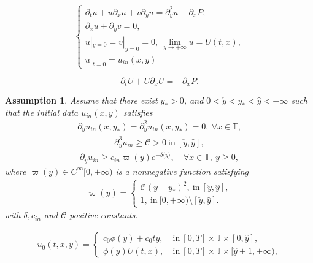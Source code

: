 \documentclass[10pt,a4paper]{amsart}
\newtheorem{assumption}{Assumption}
\newcommand\y{{{\langle y \rangle}}}
\begin{document}
\begin{equation}\label{Prandtl}
\begin{cases}
\partial_{t}u+u\partial_{x}u+v\partial_{y}u=\partial_{y}^{2}u-\partial_{x}P,\\
\partial_{x}u+\partial_{y}v=0,\\
u|_{y=0}=v|_{y=0}=0,~\lim\limits_{y\to+\infty} u=U(t,x),\\
u|_{t=0}=u_{in}(x,y)
\end{cases}
\end{equation}

\begin{equation}\label{B}
\partial_{t}U+U\partial_{x}U=-\partial_{x}P.
\end{equation}

\begin{assumption}\label{inA'}
Assume that there exist $y_\ast>0$, and $0<\check{y}<y_{*}<\hat{y}<+\infty$ such that
the initial data $u_{in}(x,y)$ satisfies
\begin{align}\label{inA1}
\partial_{y}u_{in}(x,y_{*})=\partial_{y}^{2}u_{in}(x,y_{*})=0,~\forall x\in\mathbb{T},
\end{align}
\begin{align}\label{inA2}
\partial_{y}^{3}u_{in}\geq\mathcal{C}>0~\text{in}~[\check{y},\hat{y}],
\end{align}
\begin{align}\label{inA3}
\partial_{y}u_{in}\geq c_{in}\varpi (y) e^{-\delta\y}, \quad \forall x\in  \mathbb{T}, ~y\ge 0,
\end{align}
where $\varpi(y)\in C^\infty[0,+\infty)$ is a nonnegative function satisfying
\begin{align}\label{pi}
\varpi(y)=
\begin{cases}
\mathcal{C}(y-y_{*})^{2},~\text{in}~[\check{y},\hat{y}],\\
1,~\text{in}~[0,+\infty)\setminus[\check{y},\hat{y}].
\end{cases}
\end{align}
with $\delta, c_{in}$ and $ \mathcal{C}$ positive constants.

\end{assumption}

\begin{align}\label{u0}
u_{0}(t,x,y)=
\begin{cases}
c_{0}\phi(y)+c_{0}ty,~&\text{in}~[0,T]\times\mathbb{T}\times[0,\hat{y}],\\
\phi(y)U(t,x),  ~&\text{in}~[0,T]\times\mathbb{T}\times[\hat{y}+1,+\infty),
\end{cases}
\end{align}
\end{document}
